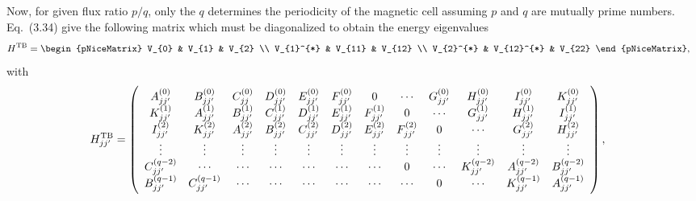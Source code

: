 Now, for given flux ratio $p/q$, only the $q$ determines the periodicity of the magnetic cell assuming $p$ and $q$ are mutually prime numbers. Eq.~(3.34) give the following matrix which must be diagonalized to obtain the energy eigenvalues
\begin{equation}
	\renewcommand{\arraystretch}{0.85}
	\begin{aligned}
		H^{\text{TB}}
		& =
		\begin{pNiceMatrix}
			V_{0}     & V_{1}      & V_{2}  \\
			V_{1}^{*} & V_{11}     & V_{12} \\
			V_{2}^{*} & V_{12}^{*} & V_{22}
		\end{pNiceMatrix},
	\end{aligned}
\end{equation}
with
\begin{equation}
	\renewcommand{\arraystretch}{0.85}
	\begin{aligned}
		H_{jj'}^{\text{TB}}
		& =
		\left(
		\begin{array}{c c c c c c c c c c c c }
			A_{jj'}^{(0)} & B_{jj'}^{(0)} & C_{jj}^{(0)} & D_{jj'}^{(0)} & E_{jj'}^{(0)} & F_{jj'}^{(0)} & 0 & \cdots & G_{jj'}^{(0)} & H_{jj'}^{(0)} & I_{jj'}^{(0)} & K_{jj'}^{(0)}\\
			K_{jj'}^{(1)} & A_{jj'}^{(1)} & B_{jj'}^{(1)} & C_{jj'}^{(1)} & D_{jj'}^{(1)} & E_{jj'}^{(1)} & F_{jj'}^{(1)} & 0 & \cdots & G_{jj'}^{(1)} & H_{jj'}^{(1)} & I_{jj'}^{(1)} \\
			I_{jj'}^{(2)} & K_{jj'}^{(2)} & A_{jj'}^{(2)} & B_{jj'}^{(2)} & C_{jj'}^{(2)} & D_{jj'}^{(2)} & E_{jj'}^{(2)} & F_{jj'}^{(2)} & 0 & \cdots & G_{jj'}^{(2)} & H_{jj'}^{(2)} \\
			\vdots & \vdots & \vdots & \vdots & \vdots & \vdots & \vdots & \vdots & \vdots & \vdots & \vdots & \vdots\\
			C_{jj'}^{(q-2)} & \cdots & \cdots & \cdots & \cdots & \cdots & \cdots & 0 & \cdots & K_{jj'}^{(q-2)} & A_{jj'}^{(q-2)} & B_{jj'}^{(q-2)} \\
			B_{jj'}^{(q-1)} & C_{jj'}^{(q-1)} & \cdots & \cdots & \cdots & \cdots & \cdots & \cdots & 0 & \cdots & K_{jj'}^{(q-1)} & A_{jj'}^{(q-1)} \\
		\end{array}
		\right),
	\end{aligned}
\end{equation}
